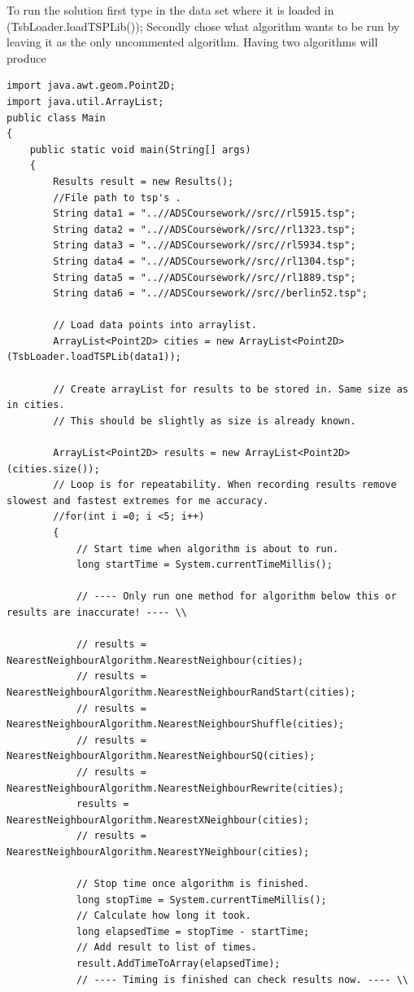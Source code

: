 \documentclass[conference,backref=page]{acmsiggraph}
\begin{document}
 To run the solution first type in the data set where it is loaded in (TsbLoader.loadTSPLib());
 Secondly chose what algorithm wants to be run by leaving it as the only uncommented algorithm. Having two algorithms will produce 
\onecolumn
\begin{verbatim}
import java.awt.geom.Point2D;
import java.util.ArrayList;
public class Main
{
	public static void main(String[] args)
	{
		Results result = new Results();		
		//File path to tsp's . 
		String data1 = "..//ADSCoursework//src//rl5915.tsp";
		String data2 = "..//ADSCoursework//src//rl1323.tsp";
		String data3 = "..//ADSCoursework//src//rl5934.tsp";
		String data4 = "..//ADSCoursework//src//rl1304.tsp";
		String data5 = "..//ADSCoursework//src//rl1889.tsp";
		String data6 = "..//ADSCoursework//src//berlin52.tsp";
		
		// Load data points into arraylist.
		ArrayList<Point2D> cities = new ArrayList<Point2D>(TsbLoader.loadTSPLib(data1));
		
		// Create arrayList for results to be stored in. Same size as in cities.
		// This should be slightly as size is already known.
		
		ArrayList<Point2D> results = new ArrayList<Point2D>(cities.size());
		// Loop is for repeatability. When recording results remove slowest and fastest extremes for me accuracy.
		//for(int i =0; i <5; i++)
		{
			// Start time when algorithm is about to run.
			long startTime = System.currentTimeMillis();
			
			// ---- Only run one method for algorithm below this or results are inaccurate! ---- \\
			
			// results = NearestNeighbourAlgorithm.NearestNeighbour(cities);
			// results = NearestNeighbourAlgorithm.NearestNeighbourRandStart(cities);
			// results = NearestNeighbourAlgorithm.NearestNeighbourShuffle(cities);
			// results = NearestNeighbourAlgorithm.NearestNeighbourSQ(cities);
			// results = NearestNeighbourAlgorithm.NearestNeighbourRewrite(cities);
			results = NearestNeighbourAlgorithm.NearestXNeighbour(cities);
			// results = NearestNeighbourAlgorithm.NearestYNeighbour(cities);
			
			// Stop time once algorithm is finished.
			long stopTime = System.currentTimeMillis();
			// Calculate how long it took.
			long elapsedTime = stopTime - startTime;
			// Add result to list of times.
			result.AddTimeToArray(elapsedTime);
			// ---- Timing is finished can check results now. ---- \\
			

\end{verbatim}
\end{document}
